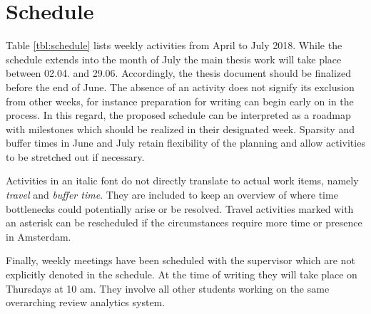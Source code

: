 \section{Schedule}
Table \ref{tbl:schedule} lists weekly activities from April to July 2018.
While the schedule extends into the month of July the main thesis work will take place between 02.04. and 29.06.
Accordingly, the thesis document should be finalized before the end of June.
The absence of an activity does not signify its exclusion from other weeks, for instance preparation for writing can begin early on in the process.
In this regard, the proposed schedule can be interpreted as a roadmap with milestones which should be realized in their designated week.
Sparsity and buffer times in June and July retain flexibility of the planning and allow activities to be stretched out if necessary.

Activities in an italic font do not directly translate to actual work items, namely \textit{travel} and \textit{buffer time}.
They are included to keep an overview of where time bottlenecks could potentially arise or be resolved.
Travel activities marked with an asterisk can be rescheduled if the circumstances require more time or presence in Amsterdam.

Finally, weekly meetings have been scheduled with the supervisor which are not explicitly denoted in the schedule.
At the time of writing they will take place on Thursdays at 10 am.
They involve all other students working on the same overarching review analytics system.

